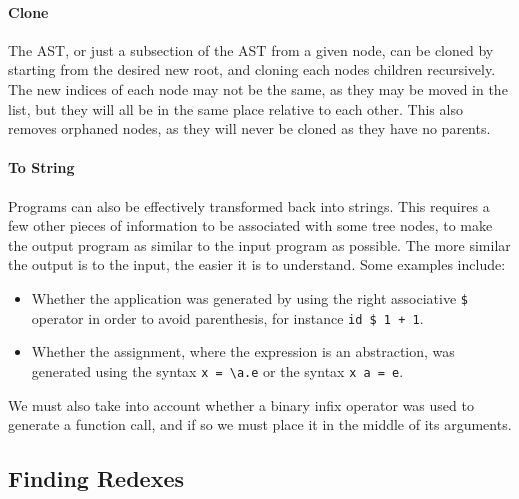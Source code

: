 \paragraph{Clone} The AST, or just a subsection of the AST from a given node, can be cloned by starting from the desired new root, and cloning each nodes children recursively. The new indices of each node may not be the same, as they may be moved in the list, but they will all be in the same place relative to each other. This also removes orphaned nodes, as they will never be cloned as they have no parents. 

\paragraph{To String} \label{paragraph:to_string} Programs can also be effectively transformed back into strings. This requires a few other pieces of information to be associated with some tree nodes, to make the output program as similar to the input program as possible. The more similar the output is to the input, the easier it is to understand. Some examples include:
\begin{itemize}
    \item Whether the application was generated by using the right associative \verb|$| operator in order to avoid parenthesis, for instance \verb|id $ 1 + 1|. 
    \item Whether the assignment, where the expression is an abstraction, was generated using the syntax \verb|x = \a.e| or the syntax \verb|x a = e|. 
\end{itemize}
We must also take into account whether a binary infix operator was used to generate a function call, and if so we must place it in the middle of its arguments. 


\subsection{Finding Redexes}


